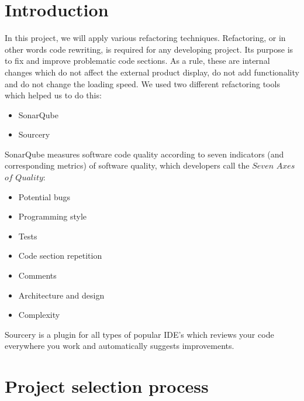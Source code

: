 \documentclass[unicode,11pt,a4paper,oneside,numbers=endperiod,openany]{scrartcl}
\begin{document}
\setassignment

\newline


\section{Introduction}
In this project, we will apply various refactoring techniques. Refactoring, or in other words code rewriting, is required for any developing project. Its purpose is to fix and improve problematic code sections. As a rule, these are internal changes which do not affect the external product display, do not add functionality and do not change the loading speed. We used two different refactoring tools which helped us to do this:
\begin{itemize}
    \item SonarQube
    \item Sourcery
\end{itemize}
SonarQube measures software code quality according to seven indicators (and corresponding metrics) of software quality, which developers call the $Seven$ $Axes$ $of$ $Quality$:
\begin{itemize}
    \item Potential bugs
    \item Programming style
    \item Tests
    \item Code section repetition
    \item Comments
    \item Architecture and design
    \item Complexity
\end{itemize}
Sourcery is a plugin for all types of popular IDE's which reviews your code everywhere you work and automatically suggests improvements.

\section{Project selection process}
\end{document}
